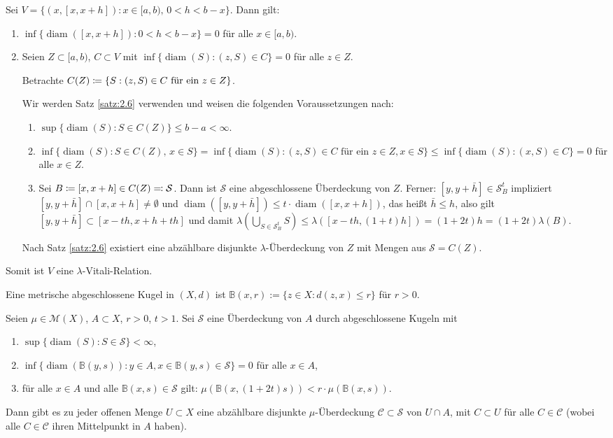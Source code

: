 \documentclass[a4paper,twoside,DIV15,BCOR12mm]{scrbook}
\DeclareMathOperator{\diam}{diam}
\begin{document}
\begin{beispiel}
Sei $V=\{(x,[x,x+h]): x\in [a,b),\, 0<h<b-x\}$. Dann gilt:
\begin{enumerate}
\item $\inf\{\diam([x,x+h]) : 0 < h < b-x\}=0$ für alle $x\in[a,b)$.
\item Seien $Z\subset [a,b)$, $C\subset V$ mit $\inf\{\diam(S): (z,S) \in C\}=0$ für alle $z\in Z$.

Betrachte $C(Z) \da \{S: (z,S)\in C\text{ für ein }z\in Z\}$.

Wir werden Satz \ref{satz:2.6} verwenden und weisen die folgenden Voraussetzungen nach:
\begin{enumerate}
\item $\sup\{\diam(S): S\in C(Z)\} \le b-a < \infty$.
\item $\inf\{\diam(S): S\in C(Z),\, x\in S\} = \inf\{\diam(S) : (z,S) \in C \text{ für ein $z\in Z$}, x\in S\} \le \inf\{\diam(S): (x,S)\in C\} = 0$ für alle $x\in Z$.
\item Sei $B \da [x,x+h] \in C(Z) \ad \mathcal S$. Dann ist $\mathcal S$ eine abgeschlossene Überdeckung von $Z$. Ferner: $[y,y+\bar h]\in\mathcal S_B^t$ impliziert $[y,y+\bar h] \cap [x,x+h] \ne \emptyset$ und $\diam([y,y+\bar h]) \le t\cdot \diam([x,x+h])$, das heißt $\bar h \le h$, also gilt $[y,y+\bar h] \subset [x-th,x+h+th]$ und damit $\lambda(\bigcup_{S\in\mathcal S_B^t}S) \le \lambda([x-th,(1+t)h]) = (1+2t)h = (1+2t)\lambda(B)$.
\end{enumerate}
Nach Satz \ref{satz:2.6} existiert eine abzählbare disjunkte $\lambda$-Überdeckung von $Z$ mit Mengen aus $\mathcal S = C(Z)$. 
\end{enumerate}
Somit ist $V$ eine $\lambda$-Vitali-Relation.
\end{beispiel}

\begin{definition}
Eine metrische abgeschlossene Kugel in $(X,d)$ ist $\mathbb B(x,r) := \{z\in X: d(z,x) \le r\}$ für $r>0$.
\end{definition}

\begin{korollar}
Seien $\mu \in \mathcal M(X)$, $A\subset X$, $r>0$, $t>1$. Sei $\mathcal S$ eine Überdeckung von $A$ durch abgeschlossene Kugeln mit
\begin{enumerate}
\item $\sup\{\diam(S): S\in\mathcal S\} <\infty$,
\item $\inf\{\diam(\mathbb B(y,s)): y\in A, x\in\mathbb B(y,s)\in \mathcal S\} = 0$ für alle $x\in A$,
\item für alle $x\in A$ und alle $\mathbb B(x,s)\in\mathcal S$ gilt: $\mu(\mathbb B(x,(1+2t)s)) < r \cdot \mu(\mathbb B(x,s))$.
\end{enumerate}
Dann gibt es zu jeder offenen Menge $U\subset X$ eine abzählbare disjunkte $\mu$-Überdeckung $\mathcal C\subset \mathcal S$ von $U\cap A$, mit $C\subset U$ für alle $C\in\mathcal C$ (wobei alle $C\in\mathcal C$ ihren Mittelpunkt in $A$ haben).
\end{korollar}
\end{document}
